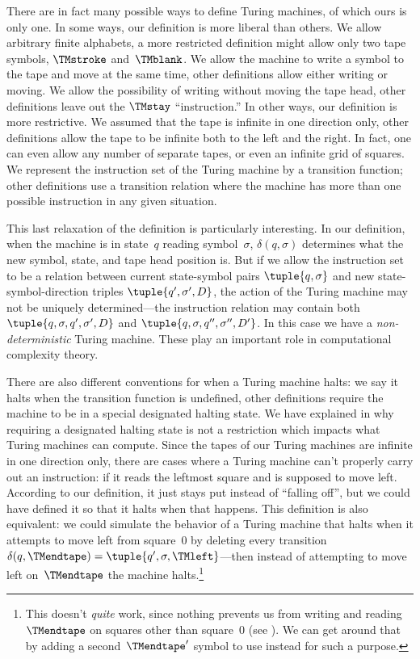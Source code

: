 \documentclass[../../../include/open-logic-section]{subfiles}
\begin{document}

There are in fact many possible ways to define Turing machines, of
which ours is only one.  In some ways, our definition is more liberal
than others. We allow arbitrary finite alphabets, a more restricted
definition might allow only two tape symbols, $\TMstroke$
and~$\TMblank$.  We allow the machine to write a symbol to the tape
and move at the same time, other definitions allow either writing or
moving.  We allow the possibility of writing without moving the tape
head, other definitions leave out the $\TMstay$ ``instruction.''  In
other ways, our definition is more restrictive. We assumed that the
tape is infinite in one direction only, other definitions allow the
tape to be infinite both to the left and the right. In fact, one can
even allow any number of separate tapes, or even an infinite grid of
squares.  We represent the instruction set of the Turing machine by a
transition function; other definitions use a transition relation where
the machine has more than one possible instruction in any given
situation.

This last relaxation of the definition is particularly interesting.
In our definition, when the machine is in state~$q$ reading
symbol~$\sigma$, $\delta(q, \sigma)$ determines what the new symbol,
state, and tape head position is.  But if we allow the instruction set
to be a relation between current state-symbol pairs $\tuple{q,
  \sigma}$ and new state-symbol-direction triples $\tuple{q', \sigma',
  D}$, the action of the Turing machine may not be uniquely
determined---the instruction relation may contain both $\tuple{q,
  \sigma, q', \sigma', D}$ and $\tuple{q, \sigma, q'', \sigma'', D'}$.
In this case we have a \emph{non-deterministic} Turing machine.  These
play an important role in computational complexity theory.

There are also different conventions for when a Turing machine halts:
we say it halts when the transition function is undefined, other
definitions require the machine to be in a special designated halting
state. We have explained in  why requiring a
designated halting state is not a restriction which impacts what
Turing machines can compute.  Since the tapes of our Turing machines
are infinite in one direction only, there are cases where a Turing
machine can't properly carry out an instruction: if it reads the
leftmost square and is supposed to move left. According to our
definition, it just stays put instead of ``falling off'', but we could
have defined it so that it halts when that happens. This definition is
also equivalent: we could simulate the behavior of a Turing machine
that halts when it attempts to move left from square~$0$ by deleting
every transition $\delta(q,\TMendtape) =
\tuple{q',\sigma,\TMleft}$---then instead of attempting to move left
on~$\TMendtape$ the machine halts.\footnote{This doesn't \emph{quite}
work, since nothing prevents us from writing and reading $\TMendtape$
on squares other than square~$0$ (see ). We can
get around that by adding a second~$\TMendtape'$ symbol to use instead
for such a purpose.}
\end{document}
